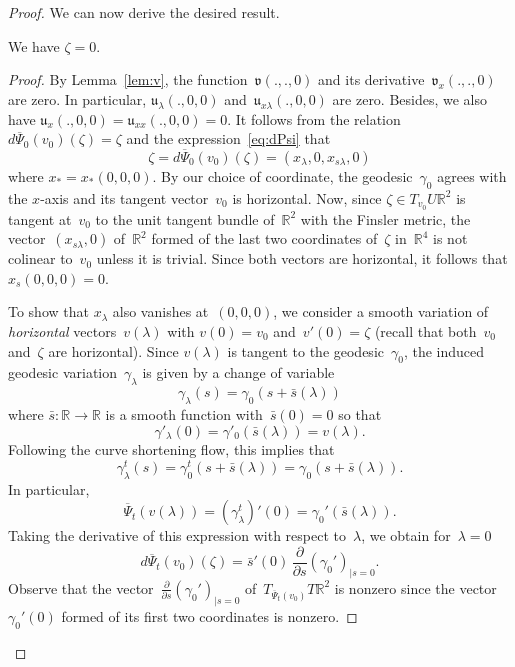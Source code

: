 \documentclass[AHL,Unicode,longabstracts,published]{cedram}
\newcommand{\R}{\mathbb{R}}
\newcommand{\bu}{\mathfrak{u}}
\newcommand{\bv}{\mathfrak{v}}
\begin{document}
\begin{proof}
We can now derive the desired result.

\begin{lemma}\label{lem:xi}
We have $\zeta=0$.
\end{lemma}

\begin{proof}
By Lemma~\ref{lem:v}, the function~$\bv(.,.,0)$ and its derivative~$\bv_x(.,.,0)$ are zero. In particular, $\bu_\lambda(.,0,0)$ and~$\bu_{x \lambda}(.,0,0)$ are zero. Besides, we also have $\bu_x(.,0,0)=\bu_{xx}(.,0,0)=0$. It follows from the relation~$d\overline{\Psi}_0(v_0)(\zeta)=\zeta$ and the expression~\eqref{eq:dPsi} that
\[
\zeta = d\overline{\Psi}_0(v_0)(\zeta) = (x_\lambda, 0, x_{s \lambda}, 0)
\]
where $x_*=x_*(0,0,0)$. By our choice of coordinate, the geodesic~$\gamma_0$ agrees with the $x$-axis and its tangent vector~$v_0$ is horizontal. Now, since $\zeta \in T_{v_0} U\R^2$ is tangent at~$v_0$ to the unit tangent bundle of~$\R^2$ with the Finsler metric, the vector~$(x_{s \lambda},0)$ of~$\R^2$ formed of the last two coordinates of~$\zeta$ in~$\R^4$ is not colinear to~$v_0$ unless it is trivial. Since both vectors are horizontal, it follows that $x_s(0,0,0)=0$.

To show that $x_\lambda$ also vanishes at~$(0,0,0)$, we consider a smooth variation of \emph{horizontal} vectors~$v(\lambda)$ with $v(0)=v_0$ and~$v'(0)=\zeta$ (recall that both~$v_0$ and~$\zeta$ are horizontal). Since $v(\lambda)$ is tangent to the geodesic~$\gamma_0$, the induced geodesic variation~$\gamma_\lambda$ is given by a change of variable
\[
\gamma_\lambda(s) = \gamma_0(s+\bar{s}(\lambda))
\]
where $\bar{s}:\R \to \R$ is a smooth function with~$\bar{s}(0)=0$ so that
\begin{equation}\label{eq:vL}
\gamma'_\lambda(0) = \gamma'_0(\bar{s}(\lambda)) = v(\lambda).
\end{equation}
Following the curve shortening flow, this implies that
\[
\gamma_\lambda^t(s) = \gamma_0^t(s+\bar{s}(\lambda)) = \gamma_0(s+\bar{s}(\lambda)).
\]
In particular,
\[
\overline{\Psi}_t(v(\lambda)) = (\gamma_\lambda^t)'(0) = \gamma_0'(\bar{s}(\lambda)).
\]
Taking the derivative of this expression with respect to~$\lambda$, we obtain for~$\lambda=0$
\[
d\overline{\Psi}_t(v_0)(\zeta) = \bar{s}'(0) \, \frac{\partial}{\partial s} (\gamma_0')_{|s=0}.
\]
Observe that the vector~$\frac{\partial}{\partial s} (\gamma_0')_{|s=0}$ of~$T_{\overline{\Psi}_t(v_0)} T \R^2$ is nonzero since the vector~$\gamma_0'(0)$ formed of its first two coordinates is nonzero.


\end{proof}
\end{proof}
\end{document}
